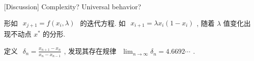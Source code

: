 \documentclass[../../main.tex]{subfiles}
\begin{document}
[Discussion] Complexity? Universal behavior? 

形如 $\begin{aligned}
    x_{j+1} = f(x_{i},\lambda)
\end{aligned}$ 的迭代方程. 如 $\begin{aligned}
    x_{i+1} = \lambda x_{i}(1-x_{i})
\end{aligned}$, 随着 $\lambda$ 值变化出现不动点 $x^{*}$ 的分形. 

定义 $\begin{aligned}
    \delta_{n} = \frac{x_{n+1}-x_{n}}{x_{n}-x_{n-1}}
\end{aligned}$, 发现其存在规律 $\begin{aligned}
    \lim_{n\rightarrow\infty}\delta_{n} = 4.6692\cdots
\end{aligned}$. 
\end{document}

